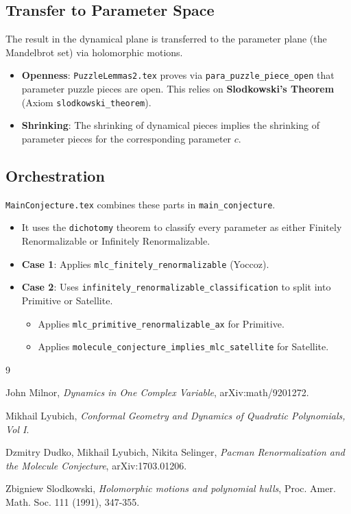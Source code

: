 \documentclass[reqno]{amsart}
\begin{document}
\subsection{Transfer to Parameter Space}
The result in the dynamical plane is transferred to the parameter plane (the Mandelbrot set) via holomorphic motions.
\begin{itemize}
    \item \textbf{Openness}: \texttt{PuzzleLemmas2.tex} proves via \texttt{para\_puzzle\_piece\_open} that parameter puzzle pieces are open. This relies on \textbf{Slodkowski's Theorem} (Axiom \texttt{slodkowski\_theorem}).
    \item \textbf{Shrinking}: The shrinking of dynamical pieces implies the shrinking of parameter pieces for the corresponding parameter $c$.
\end{itemize}

\subsection{Orchestration}
\texttt{MainConjecture.tex} combines these parts in \texttt{main\_conjecture}.
\begin{itemize}
    \item It uses the \texttt{dichotomy} theorem to classify every parameter as either Finitely Renormalizable or Infinitely Renormalizable.
    \item \textbf{Case 1}: Applies \texttt{mlc\_finitely\_renormalizable} (Yoccoz).
    \item \textbf{Case 2}: Uses \texttt{infinitely\_renormalizable\_classification} to split into Primitive or Satellite.
        \begin{itemize}
            \item Applies \texttt{mlc\_primitive\_renormalizable\_ax} for Primitive.
            \item Applies \texttt{molecule\_conjecture\_implies\_mlc\_satellite} for Satellite.
        \end{itemize}
\end{itemize}

\begin{thebibliography}{9}

John Milnor, \textit{Dynamics in One Complex Variable}, arXiv:math/9201272.

Mikhail Lyubich, \textit{Conformal Geometry and Dynamics of Quadratic Polynomials, Vol I}.

Dzmitry Dudko, Mikhail Lyubich, Nikita Selinger, \textit{Pacman Renormalization and the Molecule Conjecture}, arXiv:1703.01206.

Zbigniew Slodkowski, \textit{Holomorphic motions and polynomial hulls}, Proc. Amer. Math. Soc. 111 (1991), 347-355.

\end{thebibliography}
\end{document}
